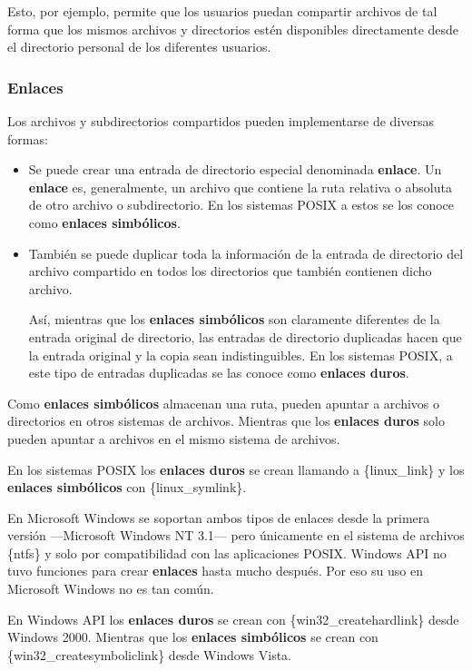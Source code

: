 Esto, por ejemplo, permite que los usuarios puedan compartir archivos de
tal forma que los mismos archivos y directorios estén disponibles
directamente desde el directorio personal de los diferentes usuarios.

\subsubsection{Enlaces}\label{_enlaces}

Los archivos y subdirectorios compartidos pueden implementarse de
diversas formas:

\begin{itemize}
\item
  Se puede crear una entrada de directorio especial denominada
  \textbf{{}enlace}. Un \textbf{enlace} es, generalmente, un archivo que
  contiene la ruta relativa o absoluta de otro archivo o subdirectorio.
  En los sistemas POSIX a estos se los conoce como \textbf{enlaces
  simbólicos}{}.
\item
  También se puede duplicar toda la información de la entrada de
  directorio del archivo compartido en todos los directorios que también
  contienen dicho archivo.

  Así, mientras que los \textbf{enlaces simbólicos} son claramente
  diferentes de la entrada original de directorio, las entradas de
  directorio duplicadas hacen que la entrada original y la copia sean
  indistinguibles. En los sistemas POSIX, a este tipo de entradas
  duplicadas se las conoce como \textbf{enlaces duros}{}.
\end{itemize}

Como \textbf{enlaces simbólicos} almacenan una ruta, pueden apuntar a
archivos o directorios en otros sistemas de archivos. Mientras que los
\textbf{enlaces duros} solo pueden apuntar a archivos en el mismo
sistema de archivos.

En los sistemas POSIX los \textbf{enlaces duros} se crean llamando a
\{linux\_link\} y los \textbf{enlaces simbólicos} con
\{linux\_symlink\}.

En Microsoft Windows se soportan ambos tipos de enlaces desde la primera
versión ---Microsoft Windows NT 3.1--- pero únicamente en el sistema de
archivos \{ntfs\} y solo por compatibilidad con las aplicaciones POSIX.
Windows API no tuvo funciones para crear \textbf{enlaces} hasta mucho
después. Por eso su uso en Microsoft Windows no es tan común.

En Windows API los \textbf{enlaces duros} se crean con
\{win32\_createhardlink\} desde Windows 2000. Mientras que los
\textbf{enlaces simbólicos} se crean con \{win32\_createsymboliclink\}
desde Windows Vista.

